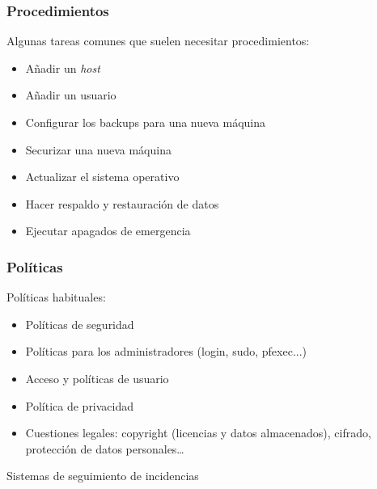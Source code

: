 \documentclass{beamer}
\begin{document}

\begin{frame}
\frametitle{Procedimientos}

Algunas tareas comunes que suelen necesitar procedimientos:

\begin{itemize}
\item Añadir un \textit{host}
\item Añadir un usuario
\item Configurar los backups para una nueva máquina
\item Securizar una nueva máquina
\item Actualizar el sistema operativo
\item Hacer respaldo y restauración de datos
\item Ejecutar apagados de emergencia
\end{itemize}
\end{frame}


\begin{frame}
\frametitle{Políticas}

Políticas habituales:

\begin{itemize}
\item Políticas de seguridad
\item Políticas para los administradores (login, sudo, pfexec...)
\item Acceso y políticas de usuario
\item Política de privacidad
\item Cuestiones legales: copyright (licencias y datos almacenados), cifrado, protección de datos personales\dots
\end{itemize}
\end{frame}



\begin{frame}

\begin{center}
\huge{Sistemas de seguimiento de incidencias}
\end{center}

\end{frame}
\end{document}
